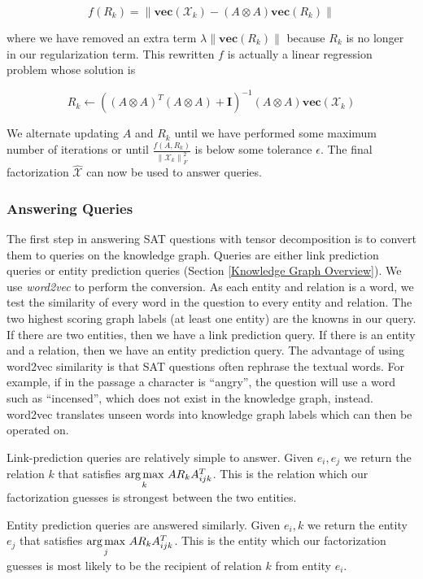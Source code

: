 \documentclass[pageno]{final_paper}
\newcommand{\norm}[1]{\left\lVert#1\right\rVert}
\begin{document}
$$f(R_k) = \norm{\textbf{vec}\left(\mathcal{X}_k\right) - \left(A \otimes A \right)
\textbf{vec}\left(R_k\right)}$$

where we have removed an extra term $\lambda \norm{\textbf{vec}(R_k)}$ because
$R_k$ is no longer in our regularization term. This rewritten $f$ is actually
a linear regression problem whose solution is

$$R_k \leftarrow \left( \left(A \otimes A \right)^T \left(A \otimes A\right) + \textbf{I}
 \right) ^{-1} \left(A \otimes A\right) \textbf{vec}\left(\mathcal{X}_k\right)$$

We alternate updating $A$ and $R_k$ until we have performed some maximum number
of iterations or until $\frac{f(A, R_k)}{\norm{\mathcal{X}_k}_F^2}$ is below
some tolerance $\epsilon$. The final factorization $\hat{\mathcal{X}}$ can now
be used to answer queries.

\subsubsection{Answering Queries}
\label{Answering Queries}

The first step in answering SAT questions with tensor decomposition is to
convert them to queries on the knowledge graph. Queries are either link
prediction queries or entity prediction queries (Section \ref{Knowledge Graph
Overview}). We use \textit{word2vec} to perform the conversion. As each entity
and relation is a word, we test the similarity of every word in the question to
every entity and relation. The two highest scoring graph labels (at least one
entity) are the knowns in our query. If there are two entities, then we have a
link prediction query. If there is an entity and a relation, then we have an
entity prediction query. The advantage of using word2vec similarity is that SAT
questions often rephrase the textual words. For example, if in the passage a
character is ``angry'', the question will use a word such as ``incensed'', which
does not exist in the knowledge graph, instead. word2vec translates unseen words
into  knowledge graph labels which can then be operated on.

Link-prediction queries are relatively simple to answer. Given $e_i, e_j$ we
return the relation $k$ that satisfies $\underset{k}{{\text{arg}}\,{\text{max}}}\,\, AR_kA^T_{ijk}$.
This is the relation which our factorization guesses is strongest between the
two entities.

Entity prediction queries are answered similarly. Given $e_i, k$ we return the
entity $e_j$ that satisfies $\underset{j}{{\text{arg}}\,{\text{max}}}\,\, AR_kA^T_{ijk}$. This is
the entity which our factorization guesses is most likely to be the recipient of
relation $k$ from entity $e_i$.
\end{document}
